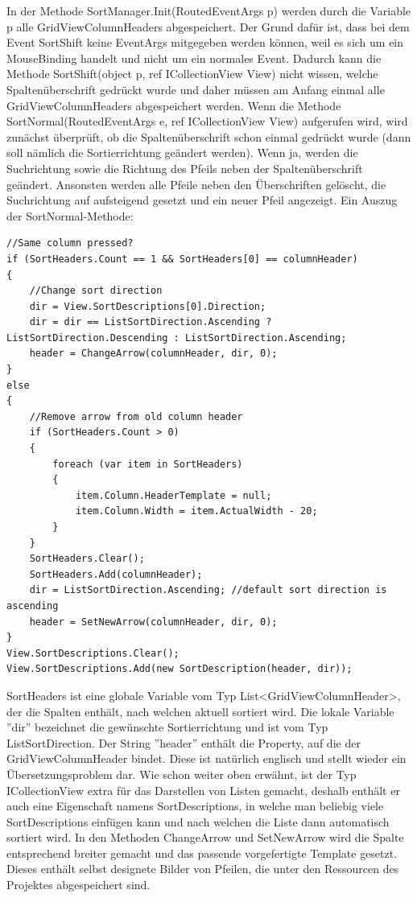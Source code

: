 In der Methode SortManager.Init(RoutedEventArgs p) werden durch die Variable p alle GridViewColumnHeaders abgespeichert. Der Grund dafür ist, dass bei dem Event SortShift keine EventArgs mitgegeben werden können, weil es sich um ein MouseBinding handelt und nicht um ein normales Event. Dadurch kann die Methode SortShift(object p, ref ICollectionView View) nicht wissen, welche Spaltenüberschrift gedrückt wurde und daher müssen am Anfang einmal alle GridViewColumnHeaders abgespeichert werden. \newline
Wenn die Methode SortNormal(RoutedEventArgs e, ref ICollectionView View) aufgerufen wird, wird zunächst überprüft, ob die Spaltenüberschrift schon einmal gedrückt wurde (dann soll nämlich die Sortierrichtung geändert werden). Wenn ja, werden die Suchrichtung sowie die Richtung des Pfeils neben der Spaltenüberschrift geändert. Ansonsten werden alle Pfeile neben den Überschriften gelöscht, die Suchrichtung auf aufsteigend gesetzt und ein neuer Pfeil angezeigt. \newline Ein Auszug der SortNormal-Methode:
\begin{lstlisting}
//Same column pressed?
if (SortHeaders.Count == 1 && SortHeaders[0] == columnHeader)
{
	//Change sort direction
	dir = View.SortDescriptions[0].Direction;
	dir = dir == ListSortDirection.Ascending ? ListSortDirection.Descending : ListSortDirection.Ascending;
	header = ChangeArrow(columnHeader, dir, 0);
}
else
{
	//Remove arrow from old column header
	if (SortHeaders.Count > 0)
	{
		foreach (var item in SortHeaders)
		{
			item.Column.HeaderTemplate = null;
			item.Column.Width = item.ActualWidth - 20;
		}
	}
	SortHeaders.Clear();
	SortHeaders.Add(columnHeader);
	dir = ListSortDirection.Ascending; //default sort direction is ascending
	header = SetNewArrow(columnHeader, dir, 0);
}
View.SortDescriptions.Clear();
View.SortDescriptions.Add(new SortDescription(header, dir));
\end{lstlisting}
SortHeaders ist eine globale Variable vom Typ List\textless GridViewColumnHeader\textgreater , der die Spalten enthält, nach welchen aktuell sortiert wird. Die lokale Variable ''dir'' bezeichnet die gewünschte Sortierrichtung und ist vom Typ ListSortDirection. Der String ''header'' enthält die Property, auf die der GridViewColumnHeader bindet. Diese ist natürlich englisch und stellt wieder ein Übersetzungsproblem dar. \newline Wie schon weiter oben erwähnt, ist der Typ ICollectionView extra für das Darstellen von Listen gemacht, deshalb enthält er auch eine Eigenschaft namens SortDescriptions, in welche man beliebig viele SortDescriptions einfügen kann und nach welchen die Liste dann automatisch sortiert wird. In den Methoden ChangeArrow und SetNewArrow wird die Spalte entsprechend breiter gemacht und das passende vorgefertigte Template gesetzt. Dieses enthält selbst designete Bilder von Pfeilen, die unter den Ressourcen des Projektes abgespeichert sind. \newpage
